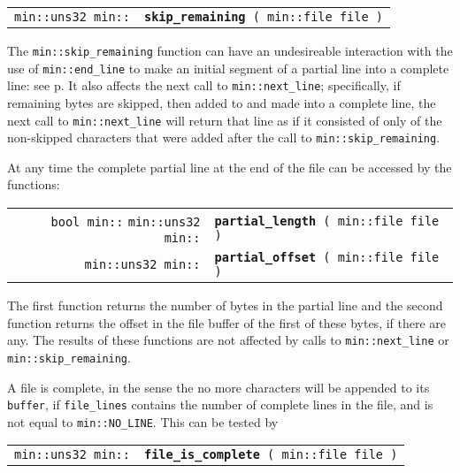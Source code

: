 \documentclass[12pt]{article}
\makeatletter
\newcommand{\ttindex}[1]{\index{#1@{\tt #1}}}
\newcommand{\minindex}[1]{\ttindex{min::#1}\ttindex{#1}}
\newcommand{\pagref}[1]{p\pageref{#1}}
\newcommand{\EOL}{\penalty \exhyphenpenalty}
\newenvironment{indpar}[1][0.3in]%
	{\begin{list}{}%
		     {\setlength{\itemsep}{0in}%
		      \setlength{\topsep}{0in}%
		      \setlength{\parsep}{1ex}%
		      \setlength{\labelwidth}{#1}%
		      \setlength{\leftmargin}{#1}%
		      \addtolength{\leftmargin}{\labelsep}}%
	 \item}%
	{\end{list}}
\newcommand{\LABEL}[1]{\label{#1}}
\newcommand{\MINKEY}[1]{{\tt \bf #1}\minindex{#1}}
\makeatother
\begin{document}
\begin{indpar}[1em]\begin{tabular}{r@{}l}
\verb|min::uns32 min::|
    & \MINKEY{skip\_\EOL remaining}\verb| ( min::file file )|
\LABEL{MIN::SKIP_REMAINING} \\
\end{tabular}\end{indpar}

The {\tt min::skip\_remaining} function can have an undesireable
interaction with the use of {\tt min::\EOL end\_\EOL line} to
make an initial segment of a partial line into a complete line:
see \pagref{SKIP_REMAINING_END_LINE}.  It also affects the next
call to {\tt min::\EOL next\_\EOL line}; specifically, if remaining
bytes are skipped, then added to and made into a complete line,
the next call to {\tt min::\EOL next\_\EOL line} will return that line as if
it consisted of only of the non-skipped characters that were added
after the call to {\tt min::\EOL skip\_\EOL remaining}.

At any time the complete partial line at the end of the file can be
accessed by the functions:

\begin{indpar}[1em]\begin{tabular}{r@{}l}
\verb|bool min::|
\verb|min::uns32 min::|
    & \MINKEY{partial\_\EOL length}\verb| ( min::file file )|
\LABEL{MIN::PARTIAL_LENGTH} \\
\verb|min::uns32 min::|
    & \MINKEY{partial\_\EOL offset}\verb| ( min::file file )|
\LABEL{MIN::PARTIAL_OFFSET} \\
\end{tabular}\end{indpar}

The first function
returns the number of bytes in the partial line and the second
function returns the offset in the file buffer of the first of these
bytes, if there are any.  The results of these functions are not
affected by calls to {\tt min::\EOL next\_\EOL line} or
{\tt min::\EOL skip\_\EOL remaining}.

A file is complete, in the sense the no more characters will be
appended to its {\tt buffer}, if {\tt file\_\EOL lines} contains
the number of complete lines in the file, and is not equal to
{\tt min::\EOL NO\_\EOL LINE}.  This can be tested by

\begin{indpar}[1em]\begin{tabular}{r@{}l}
\verb|min::uns32 min::|
    & \MINKEY{file\_\EOL is\_\EOL complete}\verb| ( min::file file )|
\LABEL{MIN::FILE_IS_COMPLETE} \\
\end{tabular}\end{indpar}
\end{document}
